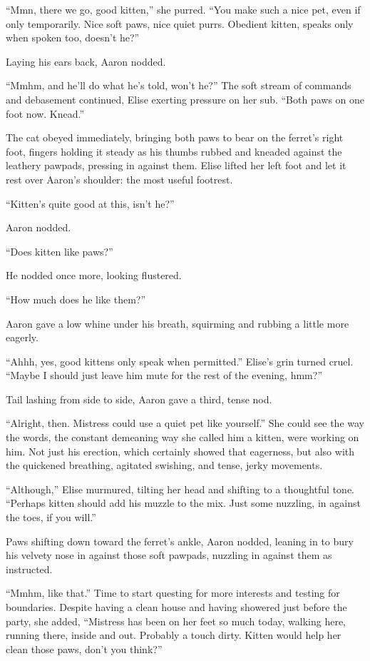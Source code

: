 ``Mmn, there we go, good kitten,'' she purred. ``You make such a nice
pet, even if only temporarily. Nice soft paws, nice quiet purrs.
Obedient kitten, speaks only when spoken too, doesn't he?''

Laying his ears back, Aaron nodded.

``Mmhm, and he'll do what he's told, won't he?'' The soft stream of
commands and debasement continued, Elise exerting pressure on her sub.
``Both paws on one foot now. Knead.''

The cat obeyed immediately, bringing both paws to bear on the ferret's
right foot, fingers holding it steady as his thumbs rubbed and kneaded
against the leathery pawpads, pressing in against them. Elise lifted her
left foot and let it rest over Aaron's shoulder: the most useful
footrest.

``Kitten's quite good at this, isn't he?''

Aaron nodded.

``Does kitten like paws?''

He nodded once more, looking flustered.

``How much does he like them?''

Aaron gave a low whine under his breath, squirming and rubbing a little
more eagerly.

``Ahhh, yes, good kittens only speak when permitted.'' Elise's grin
turned cruel. ``Maybe I should just leave him mute for the rest of the
evening, hmm?''

Tail lashing from side to side, Aaron gave a third, tense nod.

``Alright, then. Mistress could use a quiet pet like yourself.'' She
could see the way the words, the constant demeaning way she called him a
kitten, were working on him. Not just his erection, which certainly
showed that eagerness, but also with the quickened breathing, agitated
swishing, and tense, jerky movements.

``Although,'' Elise murmured, tilting her head and shifting to a
thoughtful tone. ``Perhaps kitten should add his muzzle to the mix. Just
some nuzzling, in against the toes, if you will.''

Paws shifting down toward the ferret's ankle, Aaron nodded, leaning in
to bury his velvety nose in against those soft pawpads, nuzzling in
against them as instructed.

``Mmhm, like that.'' Time to start questing for more interests and
testing for boundaries. Despite having a clean house and having showered
just before the party, she added, ``Mistress has been on her feet so
much today, walking here, running there, inside and out. Probably a
touch dirty. Kitten would help her clean those paws, don't you think?''

